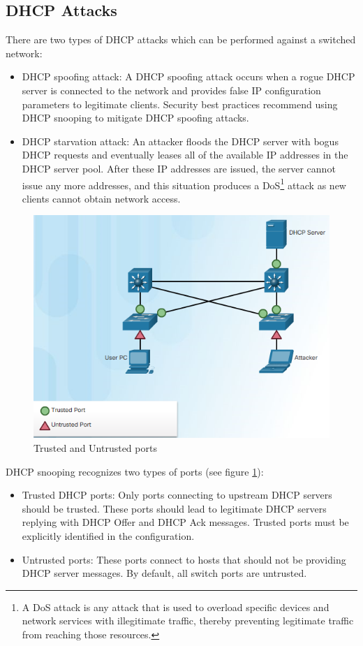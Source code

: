\subsection{DHCP Attacks}
There are two types of DHCP attacks which can be performed against a switched network: 
\begin{itemize}
\item DHCP spoofing attack: A DHCP spoofing attack occurs when a rogue DHCP server is connected to the network and provides false IP configuration parameters to legitimate clients. Security best practices recommend using DHCP snooping to mitigate DHCP spoofing attacks. 
\item DHCP starvation attack: An attacker floods the DHCP server with bogus DHCP requests and eventually leases all of the available IP addresses in the DHCP server pool. After these IP addresses are issued, the server cannot issue any more addresses, and this situation produces a DoS\footnote{A DoS attack is any attack that is used to overload specific devices and network services with illegitimate traffic, thereby preventing legitimate traffic from reaching those resources.} attack as new clients cannot obtain network access. 
\end{itemize}
	\begin{figure}[hbtp]
	\caption{Trusted and Untrusted ports}\label{DHCPsnooping}
	\centering
	\includegraphics[scale=1]{pictures/DHCPsnooping.PNG}
	\end{figure}
DHCP snooping recognizes two types of ports (see figure \ref{DHCPsnooping}):
\begin{itemize}
\item Trusted DHCP ports: Only ports connecting to upstream DHCP servers should be trusted. These ports should lead to legitimate DHCP servers replying with DHCP Offer and DHCP Ack messages. Trusted ports must be explicitly identified in the configuration.
\item Untrusted ports: These ports connect to hosts that should not be providing DHCP server messages. By default, all switch ports are untrusted.
\end{itemize}
